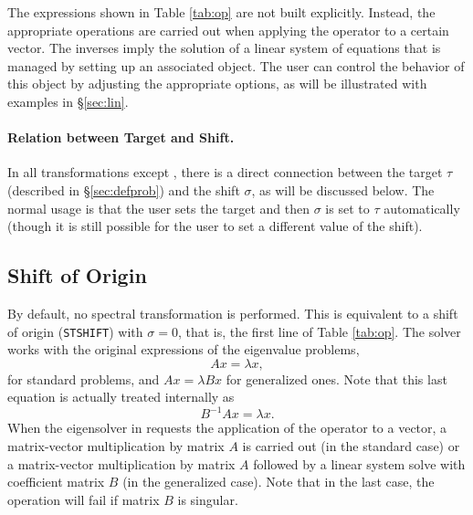 	The expressions shown in Table \ref{tab:op} are not built explicitly. Instead, the appropriate operations are carried out when applying the operator to a certain vector. The inverses imply the solution of a linear system of equations that is managed by setting up an associated  object. The user can control the behavior of this object by adjusting the appropriate options, as will be illustrated with examples in \S\ref{sec:lin}.

\paragraph{Relation between Target and Shift.}

	In all transformations except , there is a direct connection between the target $\tau$ (described in \S\ref{sec:defprob}) and the shift $\sigma$, as will be discussed below. The normal usage is that the user sets the target and then $\sigma$ is set to $\tau$ automatically (though it is still possible for the user to set a different value of the shift).

\subsection{Shift of Origin}

	By default, no spectral transformation is performed. This is equivalent to a shift of origin (\texttt{STSHIFT}) with $\sigma=0$, that is, the first line of Table \ref{tab:op}. The solver works with the original expressions of the eigenvalue problems,
\begin{equation}Ax=\lambda x,\end{equation}
for standard problems, and $Ax=\lambda Bx$ for generalized ones. Note that this last equation is actually treated internally as
\begin{equation}B^{-1}Ax=\lambda x.\end{equation}
When the eigensolver in  requests the application of the operator to a vector, a matrix-vector multiplication by matrix $A$ is carried out (in the standard case) or a matrix-vector multiplication by matrix $A$ followed by a linear system solve with coefficient matrix $B$ (in the generalized case). Note that in the last case, the operation will fail if matrix $B$ is singular.

